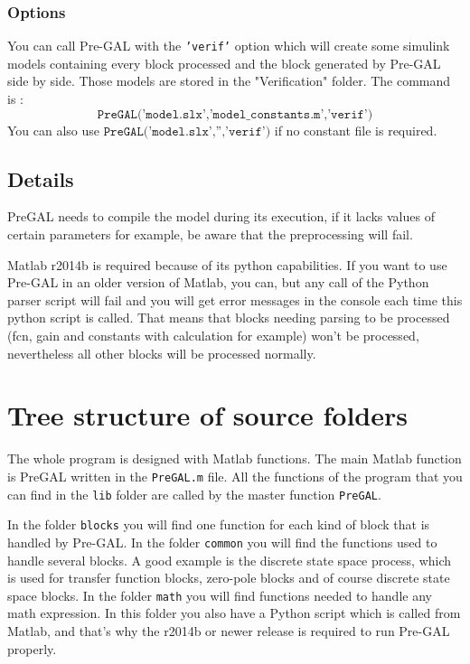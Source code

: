 \documentclass[a4paper,12pt]{article}
\begin{document}
\subsubsection*{Options}
You can call Pre-GAL with the \texttt{'verif'} option which will create some simulink models containing every block processed and the block generated by Pre-GAL side by side. 
Those models are stored in the "Verification" folder. The command is :
$$\texttt{PreGAL('model.slx','model\_constants.m','verif')}$$
You can also use $\texttt{PreGAL('model.slx','','verif')}$ if no constant file is required.

\subsection{Details}
PreGAL needs to compile the model during its execution, if it lacks values of certain parameters for example, be aware that the preprocessing will fail. \newline

Matlab r2014b is required because of its python capabilities.
If you want to use Pre-GAL in an older version of Matlab, you can, but any call of the Python parser script will fail and you will get error messages in the console each time this python script is called.
That means that blocks needing parsing to be processed (fcn, gain and constants with calculation for example) won't be processed, nevertheless all other blocks will be processed normally.


\section{Tree structure of source folders}

The whole program is designed with Matlab functions. The main Matlab function is PreGAL written in the \texttt{PreGAL.m} file.
All the functions of the program that you can find in the \texttt{lib} folder are called by the master function \texttt{PreGAL}. \newline

In the folder \texttt{blocks} you will find one function for each kind of block that is handled by Pre-GAL. \newline
In the folder \texttt{common} you will find the functions used to handle several blocks. A good example is the discrete state space process, which is used for transfer function blocks, zero-pole blocks and of course discrete state space blocks. \newline
In the folder \texttt{math} you will find functions needed to handle any math expression. In this folder you also have a Python script which is called from Matlab, and that's why the r2014b or newer release is required to run Pre-GAL properly.
\end{document}
